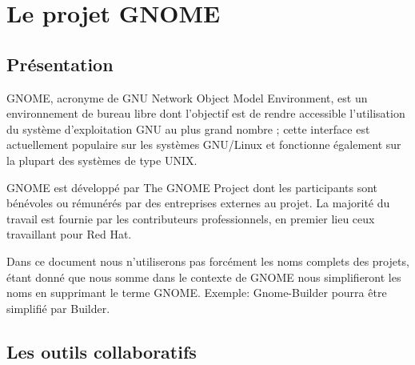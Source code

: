 \documentclass[12pt]{report}
\begin{document}


\chapter{Le projet GNOME}
\section{Présentation}
GNOME, acronyme de GNU Network Object Model Environment, est un
environnement de bureau libre  dont l'objectif est de rendre
accessible l'utilisation du système d'exploitation GNU au plus grand
nombre ; cette interface est actuellement populaire sur les systèmes
GNU/Linux et fonctionne également sur la plupart des systèmes de type
UNIX.

GNOME est développé par The GNOME Project dont les participants sont
bénévoles ou rémunérés par des entreprises externes au projet. La
majorité du travail est fournie par les contributeurs professionnels,
en premier lieu ceux travaillant pour Red Hat.

Dans ce document nous n'utiliserons pas forcément les noms complets des
projets, étant donné que nous somme dans le contexte de GNOME nous
simplifieront les noms en supprimant le terme GNOME.
Exemple: Gnome-Builder pourra être simplifié par Builder.

\section{Les outils collaboratifs} 
\end{document}
